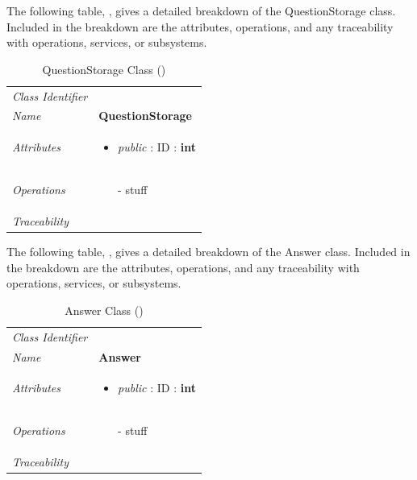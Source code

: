 \documentclass[12pt,letterpaper]{article}
\begin{document}
The following table, , gives a detailed breakdown of the QuestionStorage class. Included in the breakdown are the attributes, operations, and any traceability with operations, services, or subsystems.

\begin{table}[H]
    \caption{QuestionStorage Class ()} 
	\begin{tabu} to 
		\toprule
		Class Identifier &  \\
		Name & {\bf QuestionStorage} \\
		Attributes & 
		\begin{minipage}[t]{\linewidth}
		    \begin{itemize}
		        \item \textit{public} : ID : \bf{int}
			\end{itemize}
	    \end{minipage} \\

		Operations &
		\begin{minipage}[t]{\linewidth}
			\begin{enumerate}
			    \item[-] stuff
	        \end{enumerate}
	    \end{minipage} \\
	    	Traceability & \\
		\toprule
	\end{tabu}
\end{table}

The following table, , gives a detailed breakdown of the Answer class. Included in the breakdown are the attributes, operations, and any traceability with operations, services, or subsystems.

\begin{table}[H]
    \caption{Answer Class ()} 
	\begin{tabu} to 
		\toprule
		Class Identifier &  \\
		Name & {\bf Answer} \\
		Attributes & 
		\begin{minipage}[t]{\linewidth}
		    \begin{itemize}
		        \item \textit{public} : ID : \bf{int}
			\end{itemize}
	    \end{minipage} \\

		Operations &
		\begin{minipage}[t]{\linewidth}
			\begin{enumerate}
			    \item[-] stuff
	        \end{enumerate}
	    \end{minipage} \\
	    	Traceability & \\
		\toprule
	\end{tabu}
\end{table}
\end{document}
